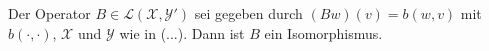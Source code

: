 \begin{Satz}
    Der Operator $B \in \mathcal L(\mathcal X, \mathcal Y')$ sei gegeben durch $(Bw)(v) = b(w, v)$ mit $b(\cdot, \cdot)$, $\mathcal X$ und $\mathcal Y$ wie in (...).
    Dann ist $B$ ein Isomorphismus.




\end{Satz}
